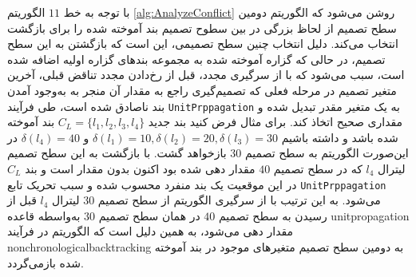 با توجه به خط 
$11$
الگوریتم 
\ref{alg:AnalyzeConflict}
روشن می‌شود که الگوریتم دومین سطح تصمیم‌ از لحاظ بزرگی  در بین سطوح تصمیم بند آموخته شده را برای بازگشت انتخاب می‌کند. دلیل  انتخاب  چنین سطح تصمیمی،   این است که   بازگشتن به  این سطح تصمیم، در حالی که گزاره آموخته شده به مجموعه بندهای گزاره اولیه  اضافه شده است، سبب می‌شود که  با از سرگیری مجدد، قبل از رخ‌دادن  مجدد  تناقض قبلی، آخرین متغیر تصمیم  در مرحله فعلی که  تصمیم‌گیری راجع به مقدار آن منجر به به‌وجود آمدن بند ناصادق شده است، طی فرآیند 
\texttt{UnitPrppagation}
به یک متغیر مقدر تبدیل شده و مقداری صحیح اتخاذ کند. برای مثال فرض کنید  بند جدید 
$C_{L} = \{l_{1}, l_{2}, l_{3}, l_{4}\}$
بند آموخته شده باشد و  داشته  باشیم 
$\delta(l_{1}) = 10, \delta(l_{2}) = 20, \delta(l_{3}) = 30$
و 
$\delta(l_{4}) = 40$
در این‌صورت الگوریتم به سطح تصمیم 
$30$
باز‌خواهد گشت.  با بازگشت  به این سطح تصمیم لیترال 
$l_{4}$
که در سطح تصمیم  
$40$
مقدار دهی شده بود اکنون بدون مقدار است و بند 
$C_{L}$
در این موقعیت یک بند منفرد محسوب شده و سبب تحریک تابع 
\texttt{UnitPrppagation}
می‌شود. به این ترتیب با از سرگیری الگوریتم از سطح تصمیم 
$30$
 لیترال 
$l_{4}$
قبل از رسیدن به سطح تصمیم 
$40$
در همان سطح تصمیم 
$30$
به‌واسطه قاعده 
\gls*{unitpropagation}
مقدار دهی می‌شود، به همین دلیل است که الگوریتم 
در  فرآیند  
\gls*{nonchronologicalbacktracking}
به دومین سطح تصمیم  متغیرهای موجود در بند آموخته شده بازمی‌گردد.  

